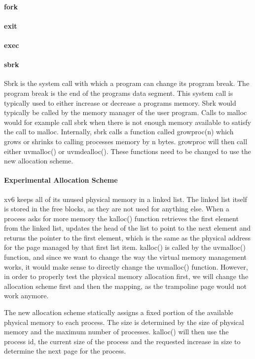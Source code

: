 \paragraph*{fork}
\paragraph*{exit}
\paragraph*{exec}
\paragraph*{sbrk}
Sbrk is the system call with which a program can change its program break. The program break
is the end of the programs data segment. This system call is typically used to either
increase or decrease a programs memory.
Sbrk would typically be called by the memory manager of the user program. Calls
to malloc would for example call sbrk when there is not enough memory available to
satisfy the call to malloc.
Internally, sbrk calls a function called growproc(n) which grows or shrinks to calling
processes memory by n bytes.
growproc will then call either uvmalloc() or uvmdealloc(). These functions need to be
changed to use the new allocation scheme.

\paragraph*{Experimental Allocation Scheme}
xv6 keeps all of its unused physical memory in a linked list. The linked list itself is stored
in the free blocks, as they are not used for anything else. When a process asks for more memory
the kalloc() function retrieves the first element from the linked list, updates the head
of the list to point to the next element and returns the pointer to the first element,
which is the same as the physical address for the page managed by that first list item.
kalloc() is called by the uvmalloc() function, and since we want to change the way
the virtual memory management works, it would make sense to directly change the uvmalloc() function.
However, in order to properly test the physical memory allocation first, we will change
the allocation scheme first and then the mapping, as the trampoline page would not work anymore.

The new allocation scheme statically assigns a fixed portion of the available physical memory
to each process. The size is determined by the size of physical memory and the maximum number
of processes.
kalloc() will then use the process id, the current size of the process and the requested
increase in size to determine the next page for the process.

